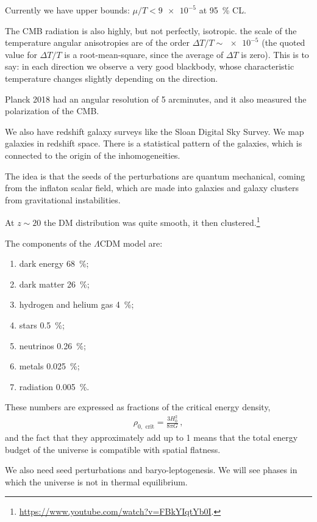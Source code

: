 \documentclass[main.tex]{subfiles}
\begin{document}
Currently we have upper bounds: \(\mu / T < \num{9e-5}\) at \SI{95}{\percent} CL. 

The CMB radiation is also highly, but not perfectly, isotropic. the scale of the temperature angular anisotropies are of the order \(\Delta T / T \sim \num{e-5}\) (the quoted value for \(\Delta T/T\) is a root-mean-square, since the average of \(\Delta T\) is zero). 
This is to say: in each direction we observe a very good blackbody, whose characteristic temperature changes slightly depending on the direction.

Planck 2018 had an angular resolution of 5 arcminutes, and it also measured the polarization of the CMB. 

We also have redshift galaxy surveys like the Sloan Digital Sky Survey. We map galaxies in redshift space. 
There is a statistical pattern of the galaxies, which is connected to the origin of the inhomogeneities. 

The idea is that the seeds of the perturbations are quantum mechanical, coming from the inflaton scalar field, which are made into galaxies and galaxy clusters from gravitational instabilities.

At \(z \sim 20\) the DM distribution was quite smooth, it then clustered.\footnote{\url{https://www.youtube.com/watch?v=FBkYIqtYb0I}.}

The components of the \(\Lambda \)CDM model are: 
\begin{enumerate}
    \item dark energy \SI{68}{\percent};
    \item dark matter \SI{26}{\percent};
    \item hydrogen and helium gas \SI{4}{\percent};
    \item stars \SI{.5}{\percent};
    \item neutrinos \SI{.26}{\percent};
    \item metals \SI{.025}{\percent};
    \item radiation \SI{.005}{\percent}.
\end{enumerate}

These numbers are expressed as fractions of the critical energy density, 
%
\begin{align}
\rho _{0,\text{ crit}} = \frac{3 H_0^2}{8 \pi G}
\,,
\end{align}
%
and the fact that they approximately add up to 1 means that the total energy budget of the universe is compatible with spatial flatness. 

We also need seed perturbations and baryo-leptogenesis.
We will see phases in which the universe is not in thermal equilibrium.
\end{document}
